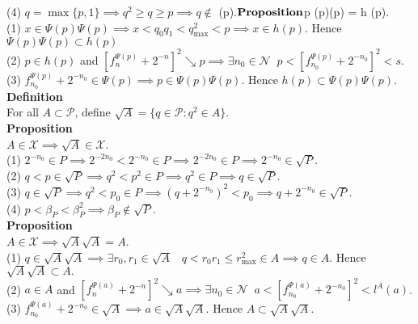 \documentclass{article}
\newcommand{\targetset}{ \mathscr{X}}
\newcommand{\sourceset}{ \mathscr{P}}
\newcommand{\naturals}{ \mathscr{N}}
\newcommand{\leaper}{l}
\newcommand{\homo}{h }
\newcommand{\elt}{q}
\newcommand{\altelt}{p}
\newcommand{\rooter}{\Psi}
\newcommand{\umbrella}{\beta}
\begin{document}
(4) $\elt = \max\{\altelt ,1\} \implies \elt^2 \ge \elt \ge \altelt \implies \elt \notin $ \rooter(\altelt).$\\ 

\textbf{Proposition}\\
$\forall \altelt \in \sourceset \;\; \rooter(\altelt)\rooter(\altelt) = \homo(\altelt).\\ 

(1) $x \in \rooter(\altelt)\rooter(\altelt) \implies x < q_0q_1 < q^2_{\max} < \altelt \implies  x \in \homo(\altelt)$. Hence $\rooter(\altelt)\rooter(\altelt) \subset \homo(\altelt)$\\
(2) $p \in \homo(\altelt)$ and $[ f^{\rooter(p)}_n + 2^{-n} ]^2 \searrow p \implies \exists n_0 \in \naturals \;\;  p < [ f^{\rooter(p)}_{n_0} + 2^{-n_0} ]^2 < s$.\\
(3) $f^{\rooter(p)}_{n_0} + 2^{-n_0} \in \rooter(\altelt) \implies p \in \rooter(\altelt)\rooter(\altelt)$. Hence $\homo(\altelt) \subset \rooter(\altelt)\rooter(\altelt)$.\\ 

\textbf{Definition}\\
For all $A \subset \sourceset$, define $\sqrt{A} = \{\elt \in \sourceset:  \elt^2 \in A\}.$\\



\textbf{Proposition}\\
$A \in \targetset \implies \sqrt{A} \in \targetset$.\\

(1) $ 2^{-n_0} \in P \implies 2^{-2n_0} < 2^{-n_0} \in P \implies 2^{-2n_0} \in P \implies 2^{-n_0} \in \sqrt{P}.$\\
(2) $\elt < \altelt \in  \sqrt{P} \implies \elt^2 < \altelt^2 \in P \implies \elt^2 \in P \implies \elt \in \sqrt{P}.$\\ 
(3) $\elt \in \sqrt{P} \implies \elt^2 < p_0 \in P \implies  (\elt + 2^{-n_0})^2 < p_0 \implies \elt + 2^{-n_0} \in   \sqrt{P}$.\\
(4) $p <  \umbrella_P < \umbrella_P^2  \implies \umbrella_P \notin  \sqrt{P}$.\\ 

\textbf{Proposition}\\
$A \in \targetset \implies \sqrt{A} \sqrt{A} = A$.\\ 

(1) $\elt \in \sqrt{A} \sqrt{A}\implies \exists r_0, r_1 \in \sqrt{A} \;\;\; \elt < r_0r_1 \le r_{\max}^2 \in A \implies \elt \in A$. Hence $\sqrt{A} \sqrt{A} \subset A.$\\
(2) $a \in A$ and  $[f^{\rooter(a)}_n + 2^{-n}]^2 \searrow a \implies \exists n_0 \in \naturals \;\; a < [f^{\rooter(a)}_{n_0} + 2^{-n_0}]^2 < \leaper^A(a) $.\\
(3) $ f^{\rooter(a)}_{n_0} + 2^{-n_0} \in \sqrt{A} \implies a \in \sqrt{A}\sqrt{A}$. Hence $A \subset \sqrt{A} \sqrt{A}$.\\ 
\end{document}
